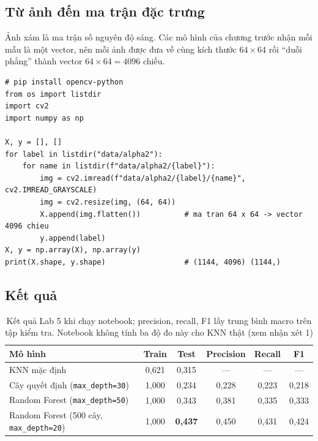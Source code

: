 \subsection{Từ ảnh đến ma trận đặc trưng}

Ảnh xám là ma trận số nguyên độ sáng. Các mô hình của chương trước nhận mỗi mẫu là một vector, nên mỗi ảnh được đưa về cùng kích thước $64 \times 64$ rồi ``duỗi phẳng'' thành vector $64 \times 64 = 4096$ chiều.

\begin{lstlisting}[caption={Lab 5 -- đọc ảnh và tạo ma trận đặc trưng}]
# pip install opencv-python
from os import listdir
import cv2
import numpy as np

X, y = [], []
for label in listdir("data/alpha2"):
    for name in listdir(f"data/alpha2/{label}"):
        img = cv2.imread(f"data/alpha2/{label}/{name}", cv2.IMREAD_GRAYSCALE)
        img = cv2.resize(img, (64, 64))
        X.append(img.flatten())          # ma tran 64 x 64 -> vector 4096 chieu
        y.append(label)
X, y = np.array(X), np.array(y)
print(X.shape, y.shape)                  # (1144, 4096) (1144,)
\end{lstlisting}


\subsection{Kết quả}

\begin{table}[H]
\centering
\begin{tabular}{|l|c|c|c|c|c|}
\hline
\textbf{Mô hình} & \textbf{Train} & \textbf{Test} & \textbf{Precision} & \textbf{Recall} & \textbf{F1} \\
\hline
KNN mặc định & 0,621 & 0,315 & --- & --- & --- \\ \hline
Cây quyết định (\texttt{max\_depth=30}) & 1,000 & 0,234 & 0,228 & 0,223 & 0,218 \\ \hline
Random Forest (\texttt{max\_depth=50}) & 1,000 & 0,343 & 0,381 & 0,335 & 0,333 \\ \hline
Random Forest (500 cây, \texttt{max\_depth=20}) & 1,000 & \textbf{0,437} & 0,450 & 0,431 & 0,424 \\ \hline
\end{tabular}
\caption{Kết quả Lab 5 khi chạy notebook; precision, recall, F1 lấy trung bình macro trên tập kiểm tra. Notebook không tính ba độ đo này cho KNN thật (xem nhận xét 1)}
\label{tab:lab-hw}
\end{table}

